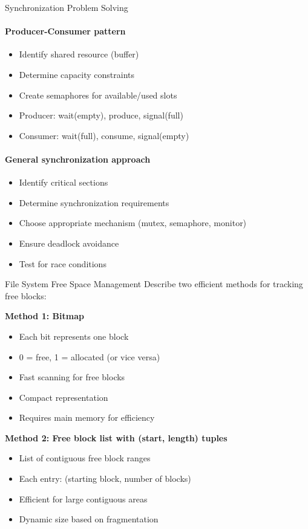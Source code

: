 \begin{KR}{Synchronization Problem Solving}
    \paragraph{Producer-Consumer pattern}
    \begin{itemize}
        \item Identify shared resource (buffer)
        \item Determine capacity constraints
        \item Create semaphores for available/used slots
        \item Producer: wait(empty), produce, signal(full)
        \item Consumer: wait(full), consume, signal(empty)
    \end{itemize}
    
    \paragraph{General synchronization approach}
    \begin{itemize}
        \item Identify critical sections
        \item Determine synchronization requirements
        \item Choose appropriate mechanism (mutex, semaphore, monitor)
        \item Ensure deadlock avoidance
        \item Test for race conditions
    \end{itemize}
\end{KR}

\begin{example2}{File System Free Space Management}
    Describe two efficient methods for tracking free blocks:
    
    \tcblower
    
    \textbf{Method 1: Bitmap}
    \begin{itemize}
        \item Each bit represents one block
        \item 0 = free, 1 = allocated (or vice versa)
        \item Fast scanning for free blocks
        \item Compact representation
        \item Requires main memory for efficiency
    \end{itemize}
    
    \textbf{Method 2: Free block list with (start, length) tuples}
    \begin{itemize}
        \item List of contiguous free block ranges
        \item Each entry: (starting block, number of blocks)
        \item Efficient for large contiguous areas
        \item Dynamic size based on fragmentation
    \end{itemize}
\end{example2}


